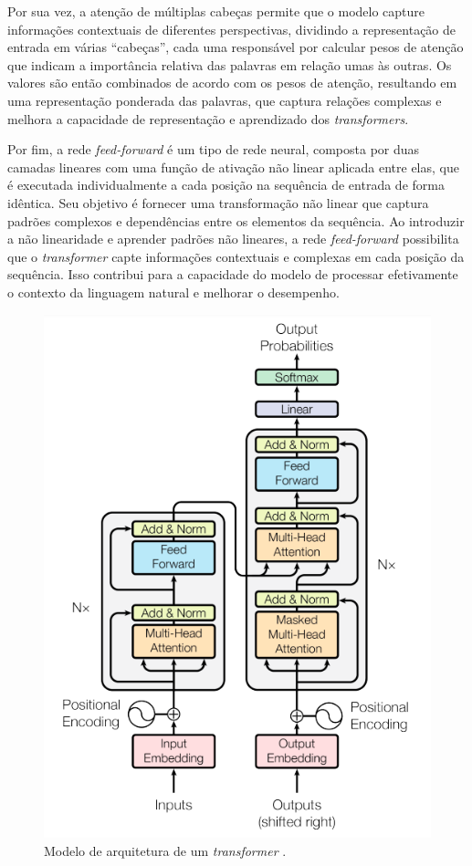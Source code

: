 Por sua vez, a atenção de múltiplas cabeças permite que o modelo capture informações contextuais de diferentes perspectivas, dividindo a representação de entrada em várias ``cabeças'', cada uma responsável por calcular pesos de atenção que indicam a importância relativa das palavras em relação umas às outras. Os valores são então combinados de acordo com os pesos de atenção, resultando em uma representação ponderada das palavras, que captura relações complexas e melhora a capacidade de representação e aprendizado dos \textit{transformers}.

Por fim, a rede \textit{feed-forward} é um tipo de rede neural, composta por duas camadas lineares com uma função de ativação não linear aplicada entre elas, que é executada individualmente a cada posição na sequência de entrada de forma idêntica. Seu objetivo é fornecer uma transformação não linear que captura padrões complexos e dependências entre os elementos da sequência. Ao introduzir a não linearidade e aprender padrões não lineares, a rede \textit{feed-forward} possibilita que o \textit{transformer} capte informações contextuais e complexas em cada posição da sequência. Isso contribui para a capacidade do modelo de processar efetivamente o contexto da linguagem natural e melhorar o desempenho.

\begin{figure}[!htbp]
	\centering
	\includegraphics[scale=0.6]{imagens/arch-transformers.png}
    \caption {Modelo de arquitetura de um \textit{transformer} \cite{GoogleTeamTransformers}.}
\end{figure}

